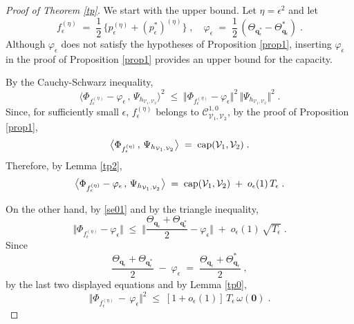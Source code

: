 \documentclass[reqno]{amsart}
\newcounter{as}[section]
\newcommand{\mc}[1]{{\mathcal #1}}
\newcommand{\bs}[1]{{\boldsymbol #1}}
\newcommand{\<}{\langle}
\renewcommand{\>}{\rangle}
\begin{document}
\begin{proof}[Proof of Theorem \ref{tp}]
We start with the upper bound. Let $\eta=\epsilon^2$ and let
\begin{equation*}
f_{\epsilon}^{(\eta)}\;=\;\frac{1}{2} \, \Big\{
p_{\epsilon}^{(\eta)} + (p_{\epsilon}^{*})^{(\eta)}\Big\}
\;,\quad \varphi_{\epsilon}\;=\;
\frac{1}{2}\,
(\Theta_{\bs{q}_{\epsilon}^{*}} - \Theta_{\bs{q}_{\epsilon}}^{*})\; .
\end{equation*}
Although $\varphi_{\epsilon}$ does not satisfy the hypotheses of
Proposition \ref{prop1}, inserting $\varphi_{\epsilon}$ in the proof
of Proposition \ref{prop1} provides an upper bound for the capacity.

By the Cauchy-Schwarz inequality,
\begin{equation}
\label{se03}
\big\langle \Phi_{f_{\epsilon}^{(\eta)}} -
\varphi_{\epsilon} \,,\, \Psi_{h_{\mc{V}_{1},\mc{V}_{2}}}
\big\rangle ^{2} \;\le\;
\big\Vert \Phi_{f_{\epsilon}^{(\eta)}} -
\varphi_{\epsilon}\big\Vert ^{2} \,
\Vert \Psi_{h_{\mc{V}_{1},\mc{V}_{2}}} \Vert ^{2}\;.
\end{equation}
Since, for sufficiently small $\epsilon$, $f_{\epsilon}^{(\eta)}$
belongs to $\mc{C}_{\mc{V}_{1},\mc{V}_{2}}^{1,0}$, by the proof of
Proposition \ref{prop1},
\begin{equation*}
\big \langle \Phi_{f_{\epsilon}^{(\eta)}} \,,\,
\Psi_{h_{\mc{V}_{1},\mc{V}_{2}}} \big\rangle
\;=\;\textup{cap}(\mc{V}_{1},\mc{V}_{2})\;.
\end{equation*}
Therefore, by Lemma \ref{tp2},
\begin{equation}
\label{se04}
\big\langle \Phi_{f_{\epsilon}^{(\eta)}} -
\varphi_{\epsilon} \,,\, \Psi_{h_{\mc{V}_{1},\mc{V}_{2}}}
\big\rangle \;=\;\textup{cap}(\mc{V}_{1},\mc{V}_{2})
\;+\; o_{\epsilon}(1)\, T_{\epsilon}\;.
\end{equation}

On the other hand, by \eqref{se01} and by the triangle inequality,
\begin{equation*}
\big\Vert \Phi_{f_{\epsilon}^{(\eta)}}
-\varphi_{\epsilon}\big\Vert \;\le\;
\Big\Vert \frac{\Theta_{\bs{q}_{\epsilon}} +
\Theta_{\bs{q}_{\epsilon}^{*}}}{2} - \varphi_{\epsilon}
\Big\Vert \;+\; o_{\epsilon}(1)\,\sqrt{T_{\epsilon}}\;.
\end{equation*}
Since
\begin{equation*}
\frac{\Theta_{\bs{q}_{\epsilon}}+\Theta_{\bs{q}_{\epsilon}^{*}}}{2}
\;-\; \varphi_{\epsilon} \;=\;
\frac{\Theta_{\bs{q}_{\epsilon}}+\Theta_{\bs{q}_{\epsilon}}^{*}}{2}\;,
\end{equation*}
by the last two displayed equations and by Lemma \ref{tp0},
\begin{equation}
\label{se05}
\big\Vert \Phi_{f_{\epsilon}^{(\eta)}} \,-\,
\varphi_{\epsilon}\big\Vert ^{2}
\;\le\; [1+o_{\epsilon}(1)] \, T_{\epsilon}
\,\omega(\bs{0})\;.
\end{equation}


\end{proof}
\end{document}
